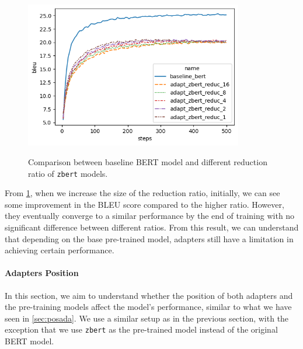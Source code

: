 \begin{figure}[]
    {\includegraphics[width=0.85\textwidth]{img/adapter_zbert_ratio.png}}
    \centering
    \caption{Comparison between baseline BERT model and different reduction ratio of \texttt{zbert} models.}
    \label{img:adapter_zbert_ratio}
\end{figure}

From \cref{img:adapter_zbert_ratio}, when we increase the size of the reduction ratio, initially, we can see some improvement in the BLEU score compared to the higher ratio. However, they eventually converge to a similar performance by the end of training with no significant difference between different ratios. From this result, we can understand that depending on the base pre-trained model, adapters still have a limitation in achieving certain performance.

\paragraph{Adapters Position}
In this section, we aim to understand whether the position of both adapters and the pre-training models affect the model's performance, similar to what we have seen in \cref{sec:posada}. We use a similar setup as in the previous section, with the exception that we use \texttt{zbert} as the pre-trained model instead of the original BERT model.

